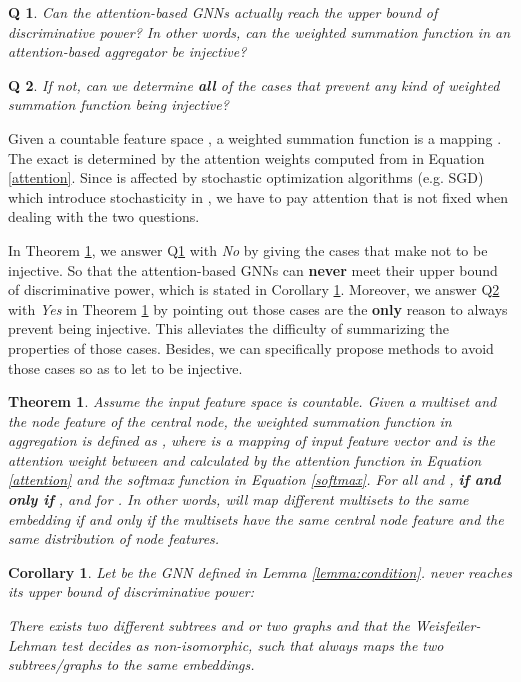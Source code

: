 \documentclass[letterpaper]{article} \usepackage{aaai20}  \usepackage{times}  \usepackage{helvet} \usepackage{courier}  \usepackage[hyphens]{url}  \usepackage{graphicx} \urlstyle{rm} \def\UrlFont{\rm}  \usepackage{graphicx}  \frenchspacing  \setlength{\pdfpagewidth}{8.5in}  \setlength{\pdfpageheight}{11in}
\theoremstyle{plain}
\newtheorem{theorem}{Theorem}
\newtheorem{corollary}{Corollary}
\newtheorem{question}{Q}
\theoremstyle{definition}
\begin{document}
\begin{question} \label{Q1}
Can the attention-based GNNs actually reach the upper bound of discriminative power? In other words, can the weighted summation function in an attention-based aggregator be injective?
\end{question}

\begin{question} \label{Q2}
If not, can we determine \textbf {all} of the cases that prevent any kind of weighted summation function being injective?
\end{question}

Given a countable feature space , a weighted summation function is a mapping . The exact  is determined by the attention weights  computed from  in Equation \ref{attention}. Since  is affected by stochastic optimization algorithms (e.g. SGD) which introduce stochasticity in , we have to pay attention that  is not fixed when dealing with the two questions. 

In Theorem \ref{theorem:att}, we answer Q\ref{Q1} with {\em  No} by giving the cases that make  not to be injective. So that the attention-based GNNs can \textbf {never} meet their upper bound of discriminative power, which is stated in Corollary \ref{corollary:WL}. Moreover, we answer Q\ref{Q2} with {\em  Yes} in Theorem \ref{theorem:att} by pointing out those cases are the \textbf {only} reason to always prevent  being injective. This alleviates the difficulty of summarizing the properties of those cases. Besides, we can specifically propose methods to avoid those cases so as to let  to be injective.

\begin{theorem} \label{theorem:att}
Assume the input feature space  is countable. Given a multiset  and the node feature  of the central node, the weighted summation function  in aggregation is defined as , where  is a mapping of input feature vector and  is the attention weight between  and  calculated by the attention function  in Equation \ref{attention} and the softmax function in Equation \ref{softmax}. For all  and ,  \textbf {if and only if} ,  and  for . In other words,  will map different multisets to the same embedding if and only if the multisets have the same central node feature and the same distribution of node features.
\end{theorem}

\begin{corollary} \label{corollary:WL}
Let  be the GNN defined in Lemma \ref{lemma:condition}.  never reaches its upper bound of discriminative power:

There exists two different subtrees  and  or two graphs  and  that the Weisfeiler-Lehman test decides as non-isomorphic, such that  always maps the two subtrees/graphs to the same embeddings.
\end{corollary}
\end{document}
